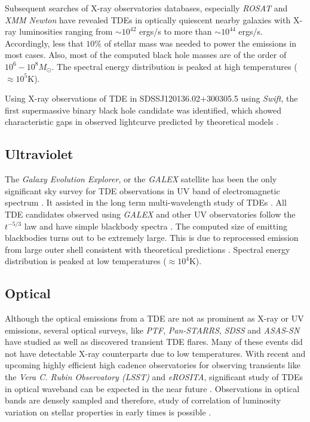 \documentclass{tda}
\begin{document}
Subsequent searches of X-ray observatories databases, especially \textit{ROSAT} and \textit{XMM Newton} have revealed TDEs in optically quiescent nearby galaxies \cite[see references in][]{komossa_tidal_2015} with X-ray luminosities ranging from \(\sim 10^{42}\) ergs/s to more than \(\sim 10^{44}\) ergs/s. Accordingly, less that \(10\%\) of stellar mass was needed to power the emissions in most cases. Also, most of the computed black hole masses are of the order of \(10^6 - 10^8 M_{\odot}\). The spectral energy distribution is peaked at high temperatures (\(\approx 10^5\)K).

Using X-ray observations of TDE in SDSSJ120136.02+300305.5 using \textit{Swift}, the first supermassive binary black hole candidate was identified, which showed characteristic gaps in observed lightcurve predicted by theoretical models \cite{liu_miliparsec_2014}.


\subsection{Ultraviolet}

The \textit{Galaxy Evolution Explorer}, or the \textit{GALEX} satellite has been the only significant sky survey for TDE observations in UV band of electromagnetic spectrum \cite{van_velzen_optical-ultraviolet_2020}. It assisted in the long term multi-wavelength study of TDEs \cite{gezari_ultraviolet_2006}. All TDE candidates observed using \textit{GALEX} and other UV observatories follow the \(t^{-5/3}\) law and have simple blackbody spectra \cite{nicholas_chamberlain_stone_tidal_2013}. The computed size of emitting blackbodies turns out to be extremely large. This is due to reprocessed emission from large outer shell consistent with theoretical predictions \cite{ulmer_flares_1999}. Spectral energy distribution is peaked at low temperatures (\(\approx 10^4\)K).

\subsection{Optical}

Although the optical emissions from a TDE are not as prominent as X-ray or UV emissions, several optical surveys, like \textit{PTF}, \textit{Pan-STARRS}, \textit{SDSS} and \textit{ASAS-SN} have studied as well as discovered transient TDE flares. Many of these events did not have detectable X-ray counterparts due to low temperatures. With recent and upcoming highly efficient high cadence observatories for observing transients like the \textit{Vera C. Rubin Observatory (LSST)} and \textit{eROSITA}, significant study of TDEs in optical waveband can be expected in the near future \cite{strubbe_optical_2009}. Observations in optical bands are densely sampled and therefore, study of correlation of luminosity variation on stellar properties in early times is possible \cite{gezari_tidal_2013}.
\end{document}
